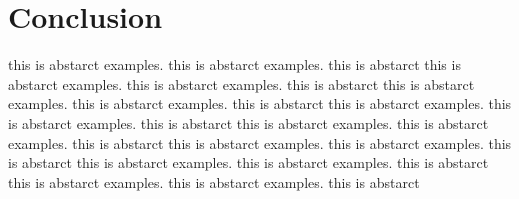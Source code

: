 \section{Conclusion}
this is abstarct examples. this is abstarct examples. this is abstarct this is abstarct examples. this is abstarct examples. this is abstarct this is abstarct examples. this is abstarct examples. this is abstarct this is abstarct examples. this is abstarct examples. this is abstarct this is abstarct examples. this is abstarct examples. this is abstarct this is abstarct examples. this is abstarct examples. this is abstarct this is abstarct examples. this is abstarct examples. this is abstarct this is abstarct examples. this is abstarct examples. this is abstarct 